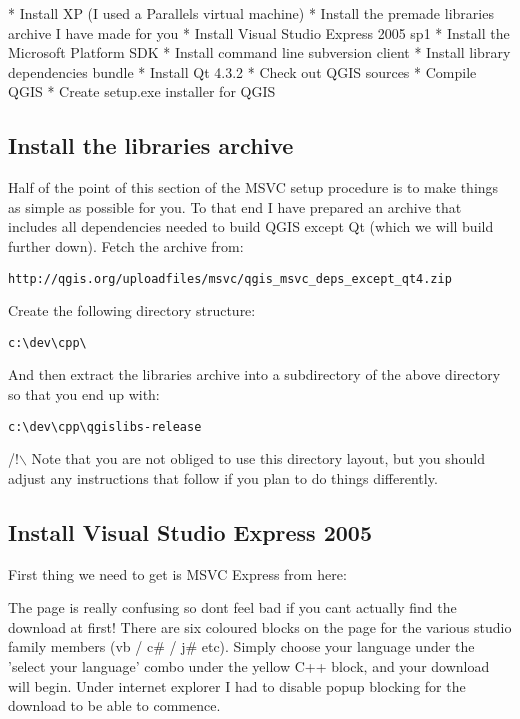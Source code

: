  * Install XP (I used a Parallels virtual machine)
 * Install the premade libraries archive I have made for you
 * Install Visual Studio Express 2005 sp1
 * Install the Microsoft Platform SDK
 * Install command line subversion client
 * Install library dependencies bundle
 * Install Qt 4.3.2
 * Check out QGIS sources
 * Compile QGIS
 * Create setup.exe installer for QGIS

\subsection{Install the libraries archive}
Half of the point of this section of the MSVC setup procedure is to make 
things as simple as possible for you. To that end I have prepared an
archive that includes all dependencies needed to build QGIS except Qt 
(which we will build further down). Fetch the archive from:

\begin{verbatim}
http://qgis.org/uploadfiles/msvc/qgis_msvc_deps_except_qt4.zip
\end{verbatim}

Create the following directory structure:

\begin{verbatim}
c:\dev\cpp\
\end{verbatim}

And then extract the libraries archive into a subdirectory of the above
directory so that you end up with:

\begin{verbatim}
c:\dev\cpp\qgislibs-release
\end{verbatim}

/!$\backslash$ Note that you are not obliged to use this directory layout, but you 
should adjust any instructions that follow if you plan to do things 
differently.

\subsection{Install Visual Studio Express 2005}
First thing we need to get is MSVC Express from here:


The page is really confusing so dont feel bad if you cant actually find the 
download at first! There are six coloured blocks on the page for the various  
studio family members (vb / c\# / j\# etc). Simply choose your language under 
the 'select your language' combo under the yellow C++ block, and your download 
will begin. Under internet explorer I had to disable popup blocking for the 
download to be able to commence.


